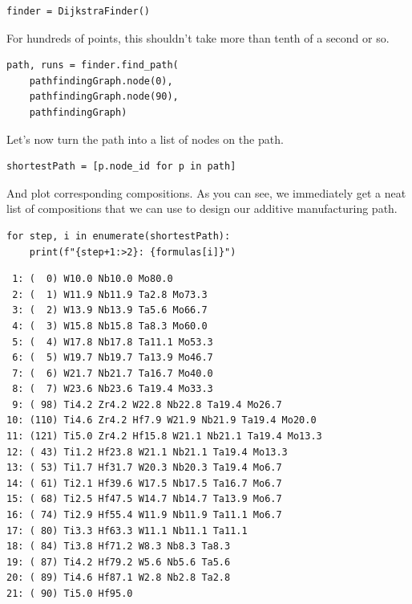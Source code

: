 \begin{verbatim}
finder = DijkstraFinder()
\end{verbatim}

For hundreds of points, this shouldn't take more than tenth of a second
or so.

\begin{verbatim}
path, runs = finder.find_path(
    pathfindingGraph.node(0), 
    pathfindingGraph.node(90), 
    pathfindingGraph)
\end{verbatim}

Let's now turn the path into a list of nodes on the path.

\begin{verbatim}
shortestPath = [p.node_id for p in path]
\end{verbatim}

And plot corresponding compositions. As you can see, we immediately get
a neat list of compositions that we can use to design our additive
manufacturing path.

\begin{verbatim}
for step, i in enumerate(shortestPath):
    print(f"{step+1:>2}: {formulas[i]}")
\end{verbatim}

\begin{verbatim}
 1: (  0) W10.0 Nb10.0 Mo80.0 
 2: (  1) W11.9 Nb11.9 Ta2.8 Mo73.3 
 3: (  2) W13.9 Nb13.9 Ta5.6 Mo66.7 
 4: (  3) W15.8 Nb15.8 Ta8.3 Mo60.0 
 5: (  4) W17.8 Nb17.8 Ta11.1 Mo53.3 
 6: (  5) W19.7 Nb19.7 Ta13.9 Mo46.7 
 7: (  6) W21.7 Nb21.7 Ta16.7 Mo40.0 
 8: (  7) W23.6 Nb23.6 Ta19.4 Mo33.3 
 9: ( 98) Ti4.2 Zr4.2 W22.8 Nb22.8 Ta19.4 Mo26.7 
10: (110) Ti4.6 Zr4.2 Hf7.9 W21.9 Nb21.9 Ta19.4 Mo20.0 
11: (121) Ti5.0 Zr4.2 Hf15.8 W21.1 Nb21.1 Ta19.4 Mo13.3 
12: ( 43) Ti1.2 Hf23.8 W21.1 Nb21.1 Ta19.4 Mo13.3 
13: ( 53) Ti1.7 Hf31.7 W20.3 Nb20.3 Ta19.4 Mo6.7 
14: ( 61) Ti2.1 Hf39.6 W17.5 Nb17.5 Ta16.7 Mo6.7 
15: ( 68) Ti2.5 Hf47.5 W14.7 Nb14.7 Ta13.9 Mo6.7 
16: ( 74) Ti2.9 Hf55.4 W11.9 Nb11.9 Ta11.1 Mo6.7 
17: ( 80) Ti3.3 Hf63.3 W11.1 Nb11.1 Ta11.1 
18: ( 84) Ti3.8 Hf71.2 W8.3 Nb8.3 Ta8.3 
19: ( 87) Ti4.2 Hf79.2 W5.6 Nb5.6 Ta5.6 
20: ( 89) Ti4.6 Hf87.1 W2.8 Nb2.8 Ta2.8 
21: ( 90) Ti5.0 Hf95.0 
\end{verbatim}

